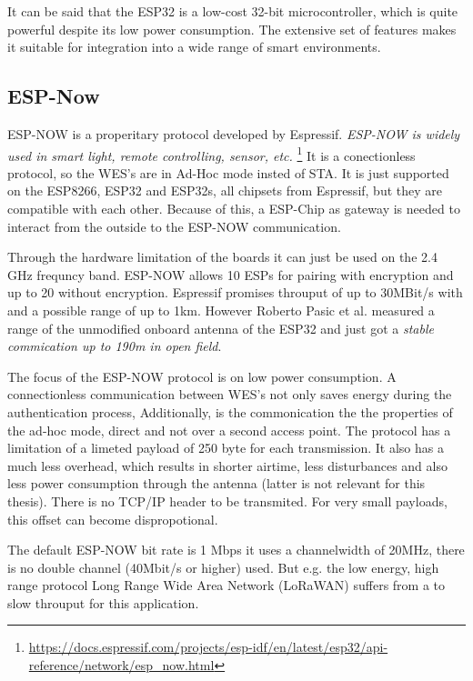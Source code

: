 It can be said that the ESP32 is a low-cost 32-bit microcontroller,
which is quite powerful despite its low power consumption.
The extensive set of features makes it suitable for integration into a wide range of smart environments.
\cite{TheWorkingPrincipalsOfESP32}

\subsection*{ESP-Now}
\label{sub:espnow}
ESP-NOW is a properitary protocol developed by Espressif. 
\emph{ESP-NOW is widely used in smart light, remote controlling, sensor, etc.}
\footnote{\url{https://docs.espressif.com/projects/esp-idf/en/latest/esp32/api-reference/network/esp_now.html}\label{note:espressif}}
It is a conectionless protocol, so the \ac{WES}'s are in Ad-Hoc mode insted of \ac{STA}.
It is just supported on the ESP8266, ESP32 and ESP32s, all chipsets from Espressif, but they are compatible with each other.
Because of this, a ESP-Chip as gateway is needed to interact from the outside to the ESP-NOW communication. 

Through the hardware limitation of the boards it can just be used on the 2.4 GHz frequncy band.
ESP-NOW allows 10 ESPs for pairing with encryption and up to 20 without encryption.
Espressif promises throuput of up to 30MBit/s with and a possible range of up to 1km.
However Roberto Pasic et al. \cite{ESPNOWCommunication} measured a range of the unmodified onboard antenna of the ESP32 
and just got a \emph{stable commication up to 190m in open field}.

The focus of the ESP-NOW protocol is on low power consumption.
A connectionless communication between \ac{WES}'s not only saves energy during the authentication process, 
Additionally, is the commonication the the properties of the ad-hoc mode, direct and not over a second access point.
The protocol has a limitation of a limeted payload of 250 byte for each transmission.
It also has a much less overhead, which results in shorter airtime, less disturbances and also less power consumption through the antenna 
(latter is not relevant for this thesis).
There is no TCP/IP header to be transmited. 
For very small payloads, this offset can become dispropotional.

The default ESP-NOW bit rate is 1 Mbps it uses a channelwidth of 20MHz, there is no double channel (40Mbit/s or higher) used.
But e.g. the low energy, high range protocol Long Range Wide Area Network (LoRaWAN) suffers from a to slow throuput for this application.

